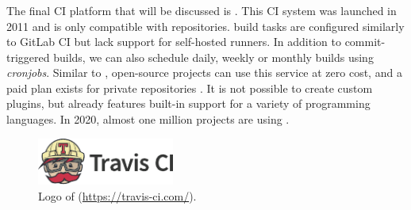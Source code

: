 
\subsubsection{\travisci}
\label{sssec:travisci}
The final CI platform that will be discussed is \travisci{}. This CI system was launched in 2011 and is only compatible with \github{} repositories. \travisci{} build tasks are configured similarly to GitLab CI but lack support for self-hosted runners. In addition to commit-triggered builds, we can also schedule daily, weekly or monthly builds using \emph{cronjobs}. Similar to \githubactions{}, open-source projects can use this service at zero cost, and a paid plan exists for private repositories \cite{travisanalysis}. It is not possible to create custom plugins, but \travisci{} already features built-in support for a variety of programming languages. In 2020, almost one million projects are using \travisci{} \cite{travis2020}.

\begin{figure}[htbp!]
	\centering
	\includegraphics[width=0.40\textwidth]{assets/images/travis-ci.pdf}
	\caption{Logo of \travisci{} (\url{https://travis-ci.com/}).}
	\label{fig:travis-ci}
\end{figure}
